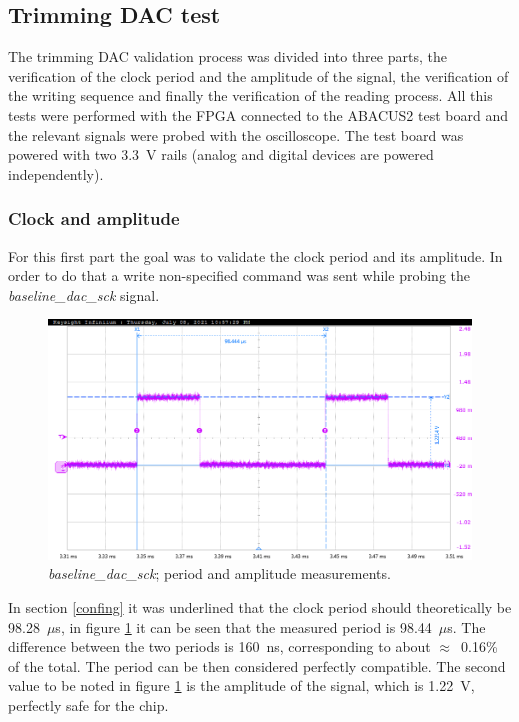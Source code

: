 \subsection{Trimming DAC test}\label{dactests}
The trimming DAC validation process was divided into three parts, the verification of the clock period and the amplitude of the signal, the verification of the writing sequence and finally the verification of the reading process. 
All this tests were performed with the FPGA connected to the ABACUS2 test board and the relevant signals were probed with the oscilloscope. The test board was powered with two 3.3~V rails (analog and digital devices are powered independently).
\subsubsection{Clock and amplitude}
For this first part the goal was to validate the clock period and its amplitude. In order to do that a write non-specified command was sent while probing the \textit{baseline\_dac\_sck} signal. 
\begin{figure}[H]
	\centering
	\includegraphics[width=0.7\linewidth]{IMG/ch5/probe/09-08-2021_clock-specks}
	\caption{\textit{baseline\_dac\_sck}; period and amplitude measurements.}
	\label{fig:clockspecs}
\end{figure}
\noindent In section \ref{confing} it was underlined that the clock period should theoretically be 98.28~$\mu$s, in figure \ref{fig:clockspecs} it can be seen that the measured period is 98.44~$\mu$s. The difference between the two periods is 160~ns, corresponding to about $\approx$~0.16\% of the total.
The period can be then considered perfectly compatible.
The second value to be noted in figure \ref{fig:clockspecs} is the amplitude of the signal, which is 1.22~V, perfectly safe for the chip. 

